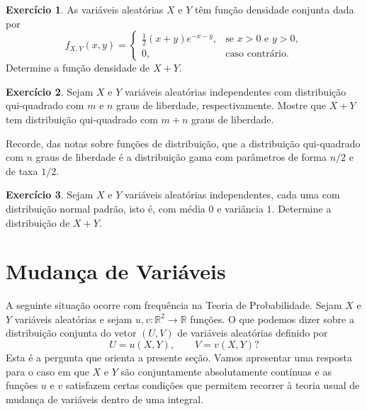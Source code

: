 \documentclass[12pt,portuguese]{article}
\theoremstyle{definition}
\theoremstyle{plainexercise}
\newtheorem{exercise}{Exercício}
\theoremstyle{starredexercise}
\theoremstyle{definition}
\begin{document}
\begin{exercise}\label{exercise:densidade-soma-exercicio}
  As variáveis aleatórias $X$ e $Y$ têm função densidade conjunta dada por
  \[
    f_{X,Y}(x, y) =
    \begin{cases}
      \frac{1}{2}(x + y)e^{-x-y}, & \text{se } x > 0 \text{ e } y > 0, \\[0.3cm]
      0, & \text{caso contrário}.
    \end{cases}
  \]
  Determine a função densidade de $X + Y$.
\end{exercise}

\begin{exercise}\label{exercise:soma-qui-quadrado}
  Sejam $X$ e $Y$ variáveis aleatórias independentes com distribuição
  qui-quadrado com $m$ e $n$ graus de liberdade, respectivamente.
  Mostre que $X + Y$ tem distribuição qui-quadrado com $m + n$ graus de
  liberdade.

  Recorde, das notas sobre funções de distribuição, que a distribuição
  qui-quadrado com $n$ graus de liberdade é a distribuição gama com
  parâmetros de forma $n/2$ e de taxa $1/2$.
\end{exercise}

\begin{exercise}\label{exercise:soma-normais}
  Sejam $X$ e $Y$ variáveis aleatórias independentes, cada uma com
  distribuição normal padrão, isto é, com média $0$ e variância $1$.
  Determine a distribuição de $X + Y$.
\end{exercise}

\section{Mudança de Variáveis}\label{sec:mudanca-variaveis}
A seguinte situação ocorre com frequência na Teoria de Probabilidade. Sejam $X$ e $Y$ variáveis
aleatórias e sejam $u, v : \mathbb{R}^2 \to \mathbb{R}$ funções. O que podemos
dizer sobre a distribuição conjunta do vetor $(U, V)$ de variáveis aleatórias
definido por
\[
  U = u(X, Y), \qquad V = v(X, Y)?
\]
Esta é a pergunta que orienta a presente seção. Vamos apresentar uma resposta
para o caso em que $X$ e $Y$ são conjuntamente absolutamente contínuas e as funções $u$ e $v$
satisfazem certas condições que permitem recorrer à teoria usual de mudança de
variáveis dentro de uma integral.
\end{document}
